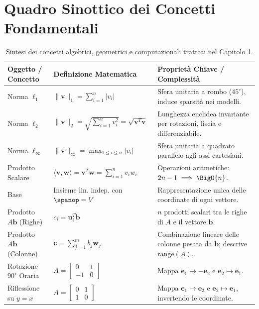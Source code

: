 \FloatBarrier
\section{Quadro Sinottico dei Concetti Fondamentali}

\begin{table}[H]
  \centering
  \small
  \setlength{\tabcolsep}{5pt}
  \begin{tabularx}{\textwidth}{l Y Y}
    \toprule
    \textbf{Oggetto / Concetto} & \textbf{Definizione Matematica} & \textbf{Proprietà Chiave / Complessità} \\
    \midrule
    Norma $\ell_1$ & $\|\mathbf{v}\|_1 = \sum_{i=1}^n |v_i|$ & Sfera unitaria a rombo ($45^\circ$), induce sparsità nei modelli. \\
    Norma $\ell_2$ & $\|\mathbf{v}\|_2 = \sqrt{\sum_{i=1}^n v_i^2} = \sqrt{\mathbf{v}^T \mathbf{v}}$ & Lunghezza euclidea invariante per rotazioni, liscia e differenziabile. \\
    Norma $\ell_\infty$ & $\|\mathbf{v}\|_\infty = \max_{1 \le i \le n} |v_i|$ & Sfera unitaria a quadrato parallelo agli assi cartesiani. \\
    Prodotto Scalare & $\langle \mathbf{v}, \mathbf{w} \rangle = \mathbf{v}^T \mathbf{w} = \sum_{i=1}^n v_i w_i$ & Operazioni aritmetiche: $2n - 1 \implies \BigO{n}$. \\
    Base & Insieme lin. indep. con $\spanop = V$ & Rappresentazione unica delle coordinate di ogni vettore. \\
    Prodotto $A \mathbf{b}$ (Righe) & $c_i = \mathbf{u}_i^T \mathbf{b}$ & $n$ prodotti scalari tra le righe di $A$ e il vettore $\mathbf{b}$. \\
    Prodotto $A \mathbf{b}$ (Colonne) & $\mathbf{c} = \sum_{j=1}^m b_j \mathbf{w}_j$ & Combinazione lineare delle colonne pesata da $\mathbf{b}$; descrive $\mathrm{range}(A)$. \\
    Rotazione $90^\circ$ Oraria & $A = \begin{bmatrix} 0 & 1 \\ -1 & 0 \end{bmatrix}$ & Mappa $\mathbf{e}_1 \mapsto -\mathbf{e}_2$ e $\mathbf{e}_2 \mapsto \mathbf{e}_1$. \\
    Riflessione su $y = x$ & $A = \begin{bmatrix} 0 & 1 \\ 1 & 0 \end{bmatrix}$ & Mappa $\mathbf{e}_1 \mapsto \mathbf{e}_2$ e $\mathbf{e}_2 \mapsto \mathbf{e}_1$, invertendo le coordinate. \\
    \bottomrule
  \end{tabularx}
  \caption{Sintesi dei concetti algebrici, geometrici e computazionali trattati nel Capitolo 1.}
  \label{tab:sintesi-capitolo-1}
\end{table}
